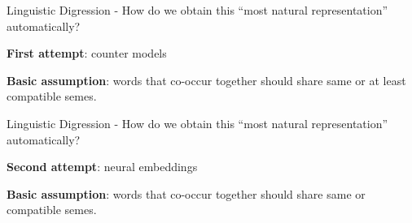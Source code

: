 \documentclass{beamer}
\begin{document}
    \begin{frame}{Linguistic Digression}
      - How do we obtain this ``most natural representation'' automatically?

      \textbf{First attempt}: counter models


      \textbf{Basic assumption}: words that co-occur together
        should share same or at least compatible semes.


    \end{frame}

    \begin{frame}{Linguistic Digression}
      - How do we obtain this ``most natural representation'' automatically?

      \textbf{Second attempt}: neural embeddings


      \textbf{Basic assumption}: words that co-occur together should share
      same or compatible semes.

    \end{frame}
\end{document}
